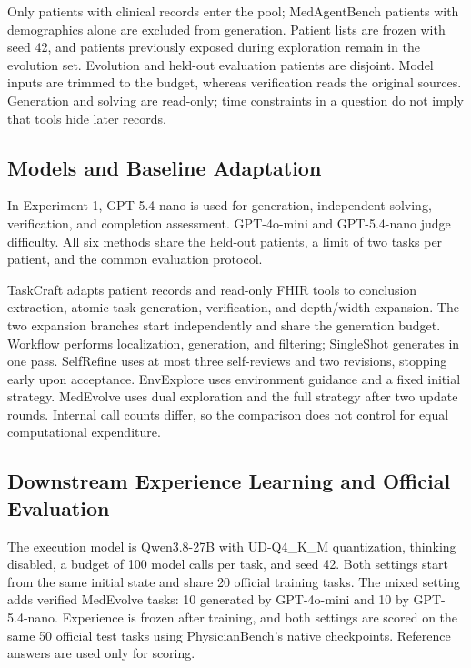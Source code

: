 \documentclass[11pt]{article}
\begin{document}
Only patients with clinical records enter the pool; MedAgentBench patients with demographics alone are excluded from generation. Patient lists are frozen with seed 42, and patients previously exposed during exploration remain in the evolution set. Evolution and held-out evaluation patients are disjoint. Model inputs are trimmed to the budget, whereas verification reads the original sources. Generation and solving are read-only; time constraints in a question do not imply that tools hide later records.

\subsection{Models and Baseline Adaptation}
\label{app:methods}

In Experiment 1, GPT-5.4-nano is used for generation, independent solving, verification, and completion assessment. GPT-4o-mini and GPT-5.4-nano judge difficulty. All six methods share the held-out patients, a limit of two tasks per patient, and the common evaluation protocol.

TaskCraft adapts patient records and read-only FHIR tools to conclusion extraction, atomic task generation, verification, and depth/width expansion. The two expansion branches start independently and share the generation budget. Workflow performs localization, generation, and filtering; SingleShot generates in one pass. SelfRefine uses at most three self-reviews and two revisions, stopping early upon acceptance. EnvExplore uses environment guidance and a fixed initial strategy. MedEvolve uses dual exploration and the full strategy after two update rounds. Internal call counts differ, so the comparison does not control for equal computational expenditure.

\subsection{Downstream Experience Learning and Official Evaluation}
\label{app:exp2}

The execution model is Qwen3.8-27B with UD-Q4\_K\_M quantization, thinking disabled, a budget of 100 model calls per task, and seed 42. Both settings start from the same initial state and share 20 official training tasks. The mixed setting adds verified MedEvolve tasks: 10 generated by GPT-4o-mini and 10 by GPT-5.4-nano. Experience is frozen after training, and both settings are scored on the same 50 official test tasks using PhysicianBench's native checkpoints. Reference answers are used only for scoring.
\end{document}
